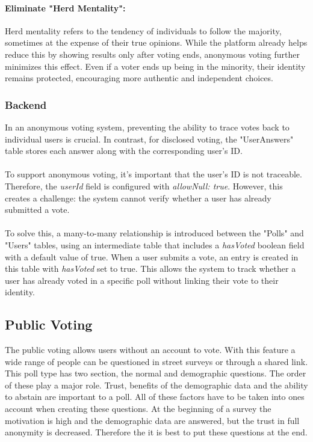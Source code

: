 \documentclass[a4paper,12pt]{report}
\begin{document}
\paragraph{Eliminate "Herd Mentality":}
Herd mentality refers to the tendency of individuals to follow the majority, sometimes at the expense of their true opinions. While the platform already helps reduce this by showing results only after voting ends, anonymous voting further minimizes this effect. Even if a voter ends up being in the minority, their identity remains protected, encouraging more authentic and independent choices. \parencite{disvsanon}

\subsubsection{Backend}
In an anonymous voting system, preventing the ability to trace votes back to individual users is crucial. In contrast, for disclosed voting, the "UserAnswers" table stores each answer along with the corresponding user's ID.\\ \\
To support anonymous voting, it's important that the user's ID is not traceable. Therefore, the \textit{userId} field is configured with \textit{allowNull: true}. However, this creates a challenge: the system cannot verify whether a user has already submitted a vote.\\ \\
To solve this, a many-to-many relationship is introduced between the "Polls" and "Users" tables, using an intermediate table that includes a \textit{hasVoted} boolean field with a default value of true. When a user submits a vote, an entry is created in this table with \textit{hasVoted} set to true. This allows the system to track whether a user has already voted in a specific poll without linking their vote to their identity. \\

\subsection{Public Voting}
The public voting allows users without an account to vote. With this feature a wide range of people can be questioned in street surveys or through a shared link. This poll type has two section, the normal and demographic questions. The order of these play a major role. Trust, benefits of the demographic data and the ability to abstain are important to a poll. All of these factors have to be taken into ones account when creating these questions. At the beginning of a survey the motivation is high and the demographic data are answered, but the trust in full anonymity is decreased. Therefore the it is best to put these questions at the end. \cite{demographicdata}
\end{document}
